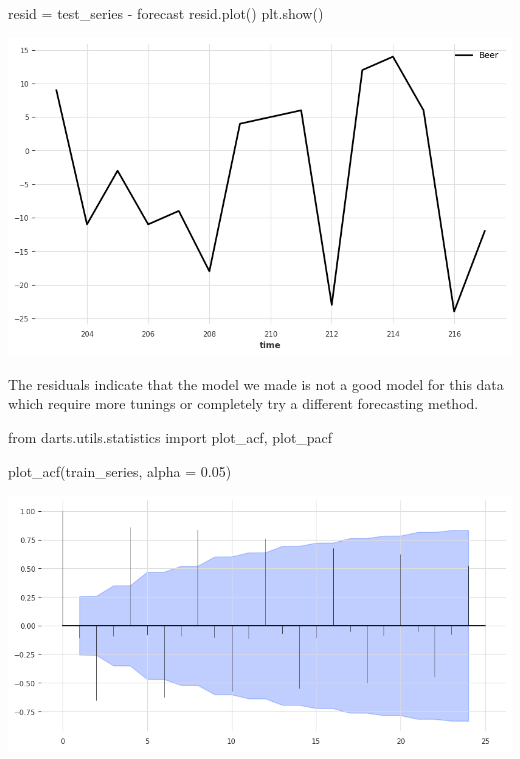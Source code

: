 \documentclass[
  11pt,
]{article}
\newenvironment{Shaded}{\begin{snugshade}}{\end{snugshade}}
\newcommand{\FloatTok}[1]{\textcolor[rgb]{0.68,0.00,0.00}{#1}}
\newcommand{\ImportTok}[1]{\textcolor[rgb]{0.00,0.46,0.62}{#1}}
\newcommand{\NormalTok}[1]{\textcolor[rgb]{0.00,0.23,0.31}{#1}}
\newcommand{\OperatorTok}[1]{\textcolor[rgb]{0.37,0.37,0.37}{#1}}
\begin{document}
\begin{Shaded}
\begin{Highlighting}[]
\NormalTok{resid }\OperatorTok{=}\NormalTok{ test\_series }\OperatorTok{{-}}\NormalTok{ forecast}
\NormalTok{resid.plot()}
\NormalTok{plt.show()}
\end{Highlighting}
\end{Shaded}

\includegraphics{hw3_files/figure-pdf/cell-36-output-1.png}

The residuals indicate that the model we made is not a good model for
this data which require more tunings or completely try a different
forecasting method.

\begin{Shaded}
\begin{Highlighting}[]
\ImportTok{from}\NormalTok{ darts.utils.statistics }\ImportTok{import}\NormalTok{ plot\_acf, plot\_pacf}

\NormalTok{plot\_acf(train\_series, alpha }\OperatorTok{=} \FloatTok{0.05}\NormalTok{)}
\end{Highlighting}
\end{Shaded}

\includegraphics{hw3_files/figure-pdf/cell-37-output-1.png}
\end{document}
